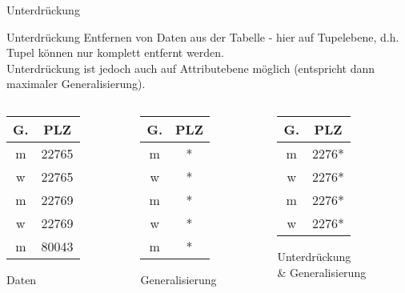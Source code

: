 \begin{frame}{Unterdrückung}
%	
	\begin{block}{Unterdrückung}
		Entfernen von Daten aus der Tabelle - hier auf Tupelebene, d.h. Tupel können nur komplett entfernt werden.\\Unterdrückung ist jedoch auch auf Attributebene möglich (entspricht dann maximaler Generalisierung).
	\end{block}

	\begin{columns}[T]
		\begin{column}{0.3\textwidth}
			\centering
			\begin{tabular}{|c|c|}
				\hline \textbf{G.} & \textbf{PLZ} \\
				\hline m & 22765 \\ 
				\hline w & 22765 \\ 
				\hline m & 22769 \\ 
				\hline w & 22769 \\ 
				\hline m & 80043 \\
				\hline
			\end{tabular}
			\vspace{0.3cm}

			Daten
		\end{column}
	
		\begin{column}{0.3\textwidth}
			\centering			
			\begin{tabular}{|c|c|}
				\hline \textbf{G.} & \textbf{PLZ} \\
				\hline m & * \\ 
				\hline w & * \\ 
				\hline m & * \\ 
				\hline w & * \\ 
				\hline m & * \\
				\hline
			\end{tabular}
			\vspace{0.3cm}

			Generalisierung
		\end{column}

		\begin{column}{0.3\textwidth}
			\centering
			\begin{tabular}{|c|c|}
				\hline \textbf{G.} & \textbf{PLZ} \\
				\hline m & 2276* \\ 
				\hline w & 2276* \\ 
				\hline m & 2276* \\ 
				\hline w & 2276* \\ 
				\hline
			\end{tabular}
			\vspace{0.6cm}

			Unterdrückung\\ \& Generalisierung
		\end{column}
	\end{columns}
\end{frame}

